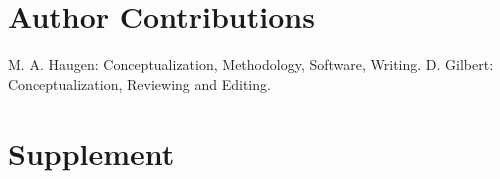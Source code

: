 \documentclass{article}
\begin{document}
\section*{Author Contributions}
M. A. Haugen: Conceptualization, Methodology, Software, Writing. D. Gilbert: Conceptualization, Reviewing and Editing.

\section*{Supplement}



\end{document}
